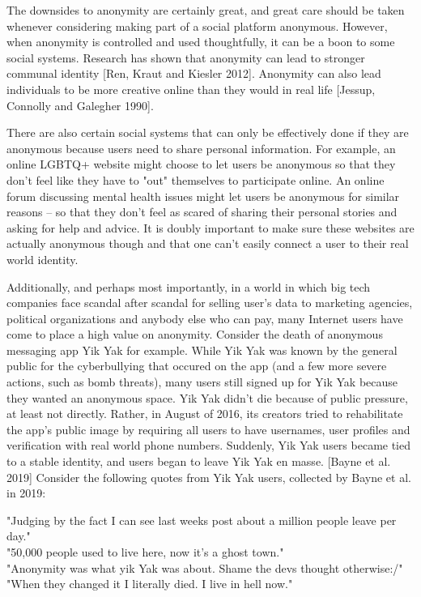 \documentclass[class=book, crop=false]{standalone}
\begin{document}
The downsides to anonymity are certainly great, and great care should be taken whenever considering making part of a social platform anonymous. However, when anonymity is controlled and used thoughtfully, it can be a boon to some social systems. Research has shown that anonymity can lead to stronger communal identity [Ren, Kraut and Kiesler 2012]. Anonymity can also lead individuals to be more creative online than they would in real life [Jessup, Connolly and Galegher 1990].

There are also certain social systems that can only be effectively done if they are anonymous because users need to share personal information. For example, an online LGBTQ+ website might choose to let users be anonymous so that they don't feel like they have to "out" themselves to participate online. An online forum discussing mental health issues might let users be anonymous for similar reasons -- so that they don't feel as scared of sharing their personal stories and asking for help and advice. It is doubly important to make sure these websites are actually anonymous though and that one can't easily connect a user to their real world identity.

Additionally, and perhaps most importantly, in a world in which big tech companies face scandal after scandal for selling user's data to marketing agencies, political organizations and anybody else who can pay, many Internet users have come to place a high value on anonymity. Consider the death of anonymous messaging app Yik Yak for example. While Yik Yak was known by the general public for the cyberbullying that occured on the app (and a few more severe actions, such as bomb threats), many users still signed up for Yik Yak because they wanted an anonymous space. Yik Yak didn't die because of public pressure, at least not directly. Rather, in August of 2016, its creators tried to rehabilitate the app's public image by requiring all users to have usernames, user profiles and verification with real world phone numbers. Suddenly, Yik Yak users became tied to a stable identity, and users began to leave Yik Yak en masse. [Bayne et al. 2019] Consider the following quotes from Yik Yak users, collected by Bayne et al. in 2019:
\begin{center}
"Judging by the fact I can see last weeks post about a million people leave per day."\\
"50,000 people used to live here, now it's a ghost town."\\
"Anonymity was what yik Yak was about. Shame the devs thought otherwise:/"\\
"When they changed it I literally died. I live in hell now."
\end{center}
\end{document}
